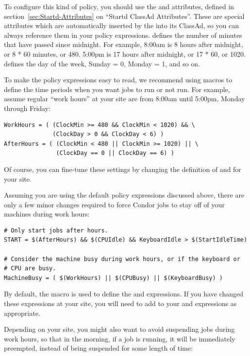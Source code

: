 To configure this kind of policy, you should use the 
and  attributes, defined in
section~\ref{sec:Startd-Attributes} on ``Startd ClassAd Attributes''.
These are special attributes which are automatically inserted by the
 into its ClassAd, so you can always reference them in
your policy expressions.
 defines the number of minutes that have passed since
midnight.  
For example, 8:00am is 8 hours after midnight, or 8 * 60 minutes, or
480.
5:00pm is 17 hours after midnight, or 17 * 60, or 1020.
 defines the day of the week, Sunday = 0, Monday = 1,
and so on.  

To make the policy expressions easy to read, we recommend using macros
to define the time periods when you want jobs to run or not run.  
For example, assume regular ``work hours'' at your site are from
8:00am until 5:00pm, Monday through Friday: 

\begin{verbatim}
WorkHours = ( (ClockMin >= 480 && ClockMin < 1020) && \
              (ClockDay > 0 && ClockDay < 6) ) 
AfterHours = ( (ClockMin < 480 || ClockMin >= 1020) || \
               (ClockDay == 0 || ClockDay == 6) )
\end{verbatim}

Of course, you can fine-tune these settings by changing the definition
of  and  for your site.

Assuming you are using the default policy expressions discussed above,
there are only a few minor changes required to force Condor jobs to
stay off of your machines during work hours:

\begin{verbatim}
# Only start jobs after hours.
START = $(AfterHours) && $(CPUIdle) && KeyboardIdle > $(StartIdleTime)

# Consider the machine busy during work hours, or if the keyboard or
# CPU are busy.
MachineBusy = ( $(WorkHours) || $(CPUBusy) || $(KeyboardBusy) )
\end{verbatim}

By default, the  macro is used to define the
 and  expressions.  
If you have changed these expressions at your site, you will need to
add \MacroUNI{WorkHours} to your \Expr{SUSPEND} and 
expressions as appropriate.  

Depending on your site, you might also want to avoid suspending jobs
during work hours, so that in the morning, if a job is running, it
will be immediately preempted, instead of being suspended for some
length of time:

